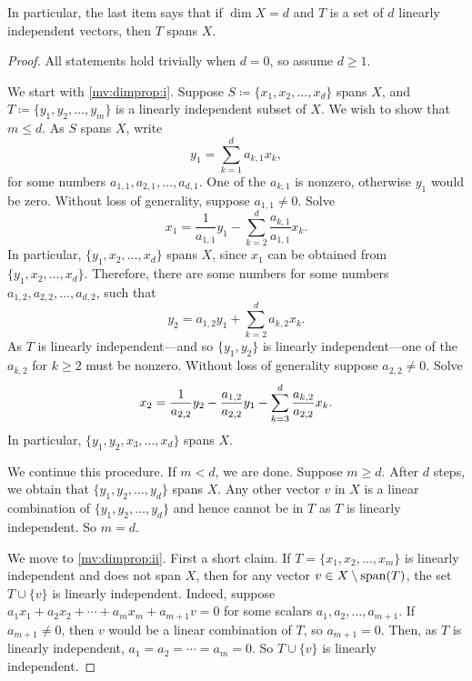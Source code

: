 In particular, the last item says that if $\dim X = d$ and $T$ is
a set of $d$ linearly independent vectors, then $T$ spans $X$.

\begin{proof}
All statements hold trivially when $d=0$, so assume $d \geq 1$.

We start with \ref{mv:dimprop:i}.
Suppose $S \coloneqq \{ x_1 , x_2, \ldots, x_d \}$ spans $X$, and
$T \coloneqq \{ y_1, y_2, \ldots, y_m \}$ is a linearly independent
subset of $X$.  We wish to show that $m \leq d$.
As $S$ spans $X$,
write
\begin{equation*}
y_1 = \sum_{k=1}^d a_{k,1} x_k ,
\end{equation*}
for some numbers $a_{1,1},a_{2,1},\ldots,a_{d,1}$.
One of the
$a_{k,1}$ is nonzero, otherwise $y_1$ would be zero.
Without loss of generality, suppose $a_{1,1} \not= 0$.  Solve
\begin{equation*}
x_1 = \frac{1}{a_{1,1}} y_1 - \sum_{k=2}^d \frac{a_{k,1}}{a_{1,1}} x_k .
\end{equation*}
In particular, $\{ y_1 , x_2, \ldots, x_d \}$ spans $X$, since $x_1$ can be
obtained from $\{ y_1 , x_2, \ldots, x_d \}$.  Therefore, there are some numbers
for some numbers $a_{1,2},a_{2,2},\ldots,a_{d,2}$, such that
\begin{equation*}
y_2 = a_{1,2} y_1 + \sum_{k=2}^d a_{k,2} x_k .
\end{equation*}
As $T$ is linearly independent---and so $\{ y_1, y_2 \}$ is linearly
independent---one of the $a_{k,2}$
for $k \geq 2$ must be nonzero.  Without loss of generality suppose 
$a_{2,2} \not= 0$.  Solve
\begin{equation*}
x_2 = \frac{1}{a_{2,2}} y_2 - \frac{a_{1,2}}{a_{2,2}} y_1 - \sum_{k=3}^d
\frac{a_{k,2}}{a_{2,2}} x_k .
\avoidbreak
\end{equation*}
In particular,
$\{ y_1 , y_2, x_3, \ldots, x_d \}$ spans $X$.

We continue this procedure.  If $m < d$, we are done.  Suppose
$m \geq d$.
After $d$ steps, we obtain that 
$\{ y_1 , y_2, \ldots, y_d \}$ spans $X$.  Any
other vector $v$ in $X$ is a linear combination of
$\{ y_1 , y_2, \ldots, y_d \}$ and hence cannot be in $T$ as $T$ is
linearly independent.  So $m = d$.

We move to \ref{mv:dimprop:ii}.
First a short claim.
If $T = \{x_1,x_2,\ldots,x_m\}$ is linearly independent and
does not span $X$, then for any vector $v \in X \setminus \operatorname{span} (T)$,
the set $T \cup \{ v \}$ is linearly independent.
Indeed, suppose 
$a_1 x_1 + a_2 x_2 + \cdots + a_m x_m + a_{m+1} v = 0$
for some scalars $a_1,a_2,\ldots,a_{m+1}$.
If $a_{m+1} \not=0$, then $v$ would be a linear combination of $T$,
so $a_{m+1} = 0$.  Then, as $T$ is linearly independent, $a_1=a_2=\cdots=a_m = 0$.
So $T \cup \{ v \}$ is linearly independent.


\end{proof}
